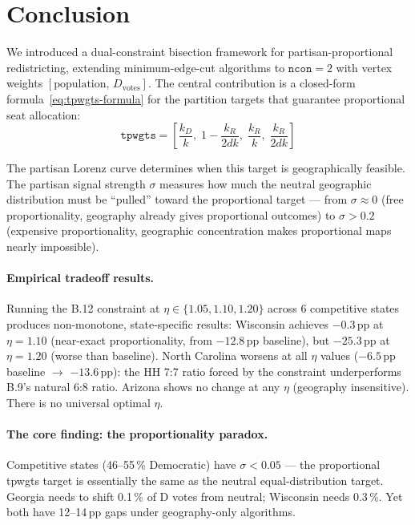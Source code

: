 \section{Conclusion}
\label{sec:conclusion}

We introduced a dual-constraint bisection framework for partisan-proportional
redistricting, extending minimum-edge-cut algorithms to $\mathtt{ncon}=2$ with
vertex weights $[\text{population},\, D_{\text{votes}}]$.
The central contribution is a closed-form formula~\eqref{eq:tpwgts-formula}
for the partition targets that guarantee proportional seat allocation:
\[
  \mathtt{tpwgts} = \left[\frac{k_D}{k},\; 1 - \frac{k_R}{2dk},\;
                          \frac{k_R}{k},\; \frac{k_R}{2dk}\right]
\]

The partisan Lorenz curve determines when this target is geographically feasible.
The partisan signal strength $\sigma$ measures how much the neutral geographic
distribution must be ``pulled'' toward the proportional target --- from
$\sigma \approx 0$ (free proportionality, geography already gives proportional
outcomes) to $\sigma > 0.2$ (expensive proportionality, geographic concentration
makes proportional maps nearly impossible).

\paragraph{Empirical tradeoff results.}
Running the B.12 constraint at $\eta \in \{1.05, 1.10, 1.20\}$ across 6 competitive
states produces non-monotone, state-specific results:
Wisconsin achieves $-0.3$\,pp at $\eta = 1.10$ (near-exact proportionality, from
$-12.8$\,pp baseline), but $-25.3$\,pp at $\eta = 1.20$ (worse than baseline).
North Carolina worsens at all $\eta$ values ($-6.5$\,pp baseline $\to$ $-13.6$\,pp):
the HH 7:7 ratio forced by the constraint underperforms B.9's natural 6:8 ratio.
Arizona shows no change at any $\eta$ (geography insensitive).
There is no universal optimal $\eta$.

\paragraph{The core finding: the proportionality paradox.}
Competitive states (46--55\,\% Democratic) have $\sigma < 0.05$ --- the
proportional tpwgts target is essentially the same as the neutral equal-distribution
target. Georgia needs to shift 0.1\,\% of D votes from neutral; Wisconsin needs
0.3\,\%. Yet both have 12--14\,pp gaps under geography-only algorithms.

